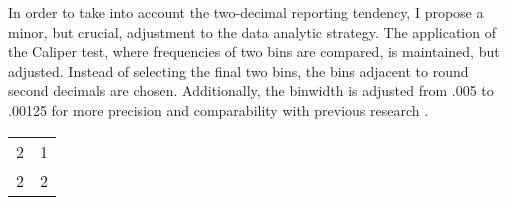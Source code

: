 In order to take into account the two-decimal reporting tendency, I propose a minor, but crucial, adjustment to the data analytic strategy. The application of the Caliper test, where frequencies of two bins are compared, is maintained, but adjusted. Instead of selecting the final two bins, the bins adjacent to round second decimals are chosen. Additionally, the binwidth is adjusted from .005 to .00125 for more precision and comparability with previous research \cite{Masicampo2012, Leggett2013}.
\begin{tabular}{ c c }
    2 & 1 \\ 
    2 & 2 \\ 
\end{tabular}